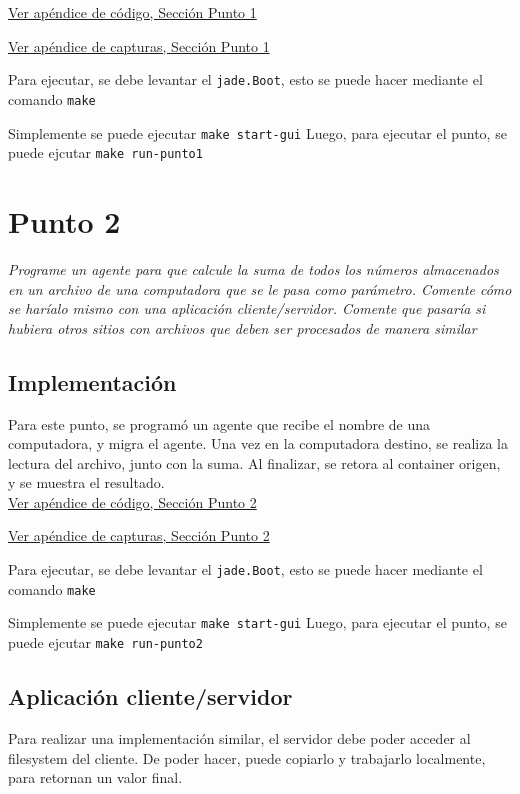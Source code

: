 \documentclass[12pt,journal,compsoc]{IEEEtran}
\begin{document}
\hyperref[section:code-punto1]{Ver apéndice de código, Sección Punto 1}

\hyperref[section:cap-punto1]{Ver apéndice de capturas, Sección Punto 1}

Para ejecutar, se debe levantar el \texttt{jade.Boot}, esto se puede hacer
mediante el comando \texttt{make}

Simplemente se puede ejecutar \texttt{make start-gui}
Luego, para ejecutar el punto, se puede ejcutar \texttt{make run-punto1}

\section{Punto 2}

\textit{Programe un agente para que calcule la suma de todos los números
almacenados en un archivo de una computadora que se le pasa como
parámetro. Comente cómo se haríalo mismo con una aplicación
cliente/servidor. Comente que pasaría si hubiera otros sitios con
archivos que deben ser procesados de manera similar}

\subsection{Implementación}

Para este punto, se programó un agente que recibe el nombre de una computadora,
y migra el agente.
Una vez en la computadora destino, se realiza la lectura del archivo,
junto con la suma.
Al finalizar, se retora al container origen, y se muestra el resultado.\\

\hyperref[section:code-punto2]{Ver apéndice de código, Sección Punto 2}

\hyperref[section:cap-punto2]{Ver apéndice de capturas, Sección Punto 2}

Para ejecutar, se debe levantar el \texttt{jade.Boot}, esto se puede hacer
mediante el comando \texttt{make}

Simplemente se puede ejecutar \texttt{make start-gui}
Luego, para ejecutar el punto, se puede ejcutar \texttt{make run-punto2}

\subsection{Aplicación cliente/servidor}

Para realizar una implementación similar, el servidor debe poder acceder
al filesystem del cliente. De poder hacer, puede copiarlo y trabajarlo
localmente, para retornan un valor final.
\end{document}
